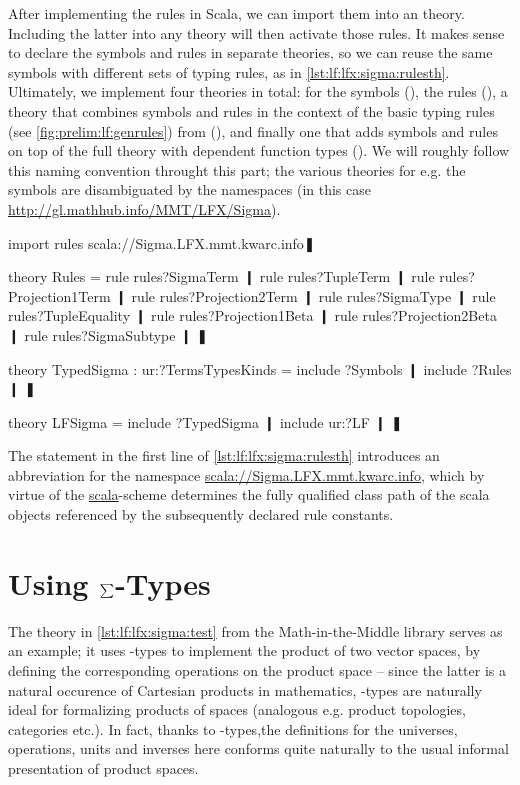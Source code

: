 After implementing the rules in Scala, we can import them into an \mmt theory. Including the latter into any theory will then activate those rules. It makes sense to declare the symbols and rules in separate theories, so we can reuse the same symbols with different sets of typing rules, as in \autoref{lst:lf:lfx:sigma:rulesth}. Ultimately, we implement four theories in total: for the symbols (), the rules (), a theory that combines symbols and rules in the context of the basic typing rules (see \autoref{fig:prelim:lf:genrules}) from \LF (), and finally one that adds symbols and rules on top of the full \LF theory with dependent function types (). We will roughly follow this naming convention throught this part; the various theories for e.g. the symbols are disambiguated by the namespaces (in this case \url{http://gl.mathhub.info/MMT/LFX/Sigma}).

\begin{mmtcode}[caption=The \cn{Rules} Theory\protect\footnotemark,label=lst:lf:lfx:sigma:rulesth]
import rules scala://Sigma.LFX.mmt.kwarc.info❚

theory Rules =
  rule rules?SigmaTerm 		❙
  rule rules?TupleTerm 		❙
  rule rules?Projection1Term	❙
  rule rules?Projection2Term	❙
  rule rules?SigmaType 		❙
  rule rules?TupleEquality 	❙
  rule rules?Projection1Beta	❙
  rule rules?Projection2Beta	❙
  rule rules?SigmaSubtype	❙
❚

theory TypedSigma : ur:?TermsTypesKinds =
  include ?Symbols 	❙
  include ?Rules 	❙
❚
   
theory LFSigma =
  include ?TypedSigma 		❙
  include ur:?LF		❙
❚
\end{mmtcode}

The  statement in the first line of \autoref{lst:lf:lfx:sigma:rulesth} introduces an abbreviation for the namespace \url{scala://Sigma.LFX.mmt.kwarc.info}, which by virtue of the \url{scala}-scheme determines the fully qualified class path of the scala objects referenced by the subsequently declared rule constants.

\section{Using $\sum$-Types}

The theory in \autoref{lst:lf:lfx:sigma:test} from the Math-in-the-Middle library serves as an example; it uses \sigmasym-types to implement the product of two vector spaces, by defining the corresponding operations on the product space -- since the latter is a natural occurence of Cartesian products in mathematics, \sigmasym-types are naturally ideal for formalizing products of spaces (analogous e.g. product topologies, categories etc.). In fact, thanks to \sigmasym-types,the definitions for the universes, operations, units and inverses here conforms quite naturally to the usual informal presentation of product spaces. 

